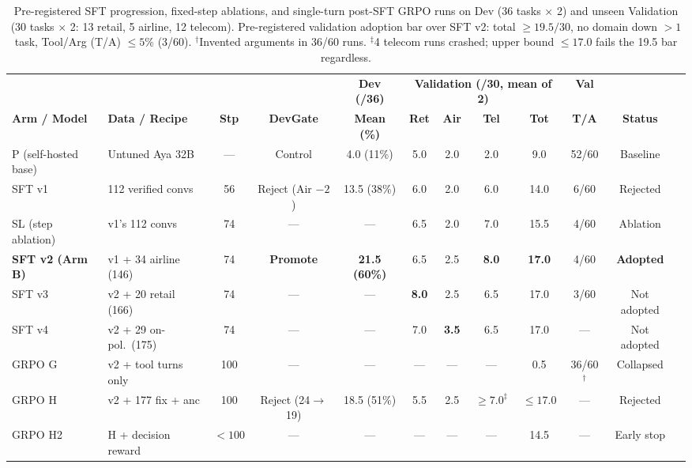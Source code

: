 \documentclass[11pt]{article}
\begin{document}
\begin{table}[t]
\centering
\scriptsize
\setlength{\tabcolsep}{2.8pt}
\begin{tabular}{llcccccccccl}
\toprule
 & & & & \textbf{Dev (/36)} & \multicolumn{4}{c}{\textbf{Validation (/30, mean of 2)}} & \textbf{Val} & \\
\cmidrule(lr){6-9}
\textbf{Arm / Model} & \textbf{Data / Recipe} & \textbf{Stp} & \textbf{DevGate} & \textbf{Mean (\%)} & \textbf{Ret} & \textbf{Air} & \textbf{Tel} & \textbf{Tot} & \textbf{T/A} & \textbf{Status} \\
\midrule
P (self-hosted base) & Untuned Aya 32B & --- & Control & 4.0 (11\%) & 5.0 & 2.0 & 2.0 & 9.0 & 52/60 & Baseline \\
SFT v1 & 112 verified convs & 56 & Reject (Air $-2$) & 13.5 (38\%) & 6.0 & 2.0 & 6.0 & 14.0 & 6/60 & Rejected \\
SL (step ablation) & v1's 112 convs & 74 & --- & --- & 6.5 & 2.0 & 7.0 & 15.5 & 4/60 & Ablation \\
\textbf{SFT v2 (Arm B)} & v1 + 34 airline (146) & 74 & \textbf{Promote} & \textbf{21.5 (60\%)} & 6.5 & 2.5 & \textbf{8.0} & \textbf{17.0} & 4/60 & \textbf{Adopted} \\
SFT v3 & v2 + 20 retail (166) & 74 & --- & --- & \textbf{8.0} & 2.5 & 6.5 & 17.0 & 3/60 & Not adopted \\
SFT v4 & v2 + 29 on-pol.\ (175) & 74 & --- & --- & 7.0 & \textbf{3.5} & 6.5 & 17.0 & --- & Not adopted \\
\midrule
GRPO G & v2 + tool turns only & 100 & --- & --- & --- & --- & --- & 0.5 & 36/60$^\dagger$ & Collapsed \\
GRPO H & v2 + 177 fix + anc & 100 & Reject (24$\to$19) & 18.5 (51\%) & 5.5 & 2.5 & $\ge 7.0^\ddagger$ & $\le 17.0$ & --- & Rejected \\
GRPO H2 & H + decision reward & $<100$ & --- & --- & --- & --- & --- & 14.5 & --- & Early stop \\
\bottomrule
\end{tabular}
\caption{Pre-registered SFT progression, fixed-step ablations, and single-turn post-SFT GRPO runs on Dev (36 tasks $\times$ 2) and unseen Validation (30 tasks $\times$ 2: 13 retail, 5 airline, 12 telecom). Pre-registered validation adoption bar over SFT v2: total $\ge 19.5/30$, no domain down $>1$ task, Tool/Arg (T/A) $\le 5\%$ (3/60). $^\dagger$Invented arguments in 36/60 runs. $^\ddagger$4 telecom runs crashed; upper bound $\le 17.0$ fails the 19.5 bar regardless.}
\label{tab:sft_grpo}
\end{table}
\end{document}
